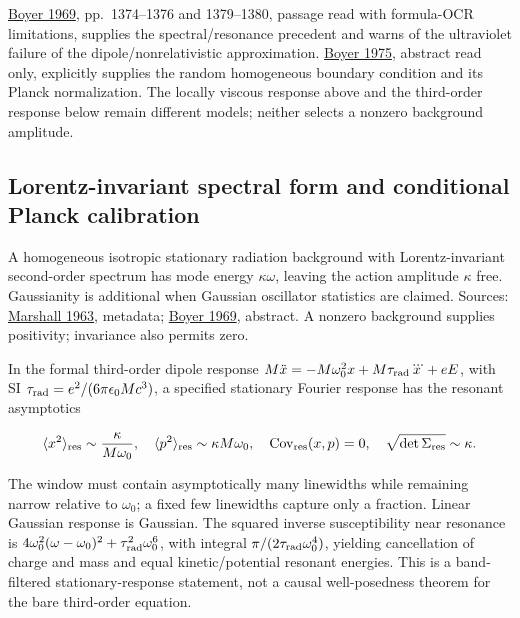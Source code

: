 \documentclass[11pt,a4paper]{article}
\begin{document}
\href{https://harvest.aps.org/v2/journals/articles/10.1103/PhysRev.182.1374/fulltext}{Boyer
1969}, pp.~1374--1376 and 1379--1380, passage read with formula-OCR
limitations, supplies the spectral/resonance precedent and warns of the
ultraviolet failure of the dipole/nonrelativistic approximation.
\href{https://journals.aps.org/prd/abstract/10.1103/PhysRevD.11.790}{Boyer
1975}, abstract read only, explicitly supplies the random homogeneous
boundary condition and its Planck normalization. The locally viscous
response above and the third-order response below remain different
models; neither selects a nonzero background amplitude.

\hypertarget{lorentz-invariant-spectral-form-and-conditional-planck-calibration}{%
\subsection{Lorentz-invariant spectral form and conditional Planck
calibration}\label{lorentz-invariant-spectral-form-and-conditional-planck-calibration}}

A homogeneous isotropic stationary radiation background with
Lorentz-invariant second-order spectrum has mode energy
\(\kappa\omega\), leaving the action amplitude \(\kappa\) free.
Gaussianity is additional when Gaussian oscillator statistics are
claimed. Sources: \href{https://doi.org/10.1098/rspa.1963.0220}{Marshall
1963}, metadata; \href{https://doi.org/10.1103/PhysRev.182.1374}{Boyer
1969}, abstract. A nonzero background supplies positivity; invariance
also permits zero.

In the formal third-order dipole response
\(M\ddot x=-M\omega_0^2x+M\tau_{\rm rad}\dddot x+eE\), with SI
\(\tau_{\rm rad}=e^2/(6\pi\epsilon_0Mc^3)\), a specified stationary
Fourier response has the resonant asymptotics

\[\langle x^2\rangle_{\rm res}\sim\frac\kappa{M\omega_0},\quad
\langle p^2\rangle_{\rm res}\sim\kappa M\omega_0,\quad
\operatorname{Cov}_{\rm res}(x,p)=0,\quad
\sqrt{\det\Sigma_{\rm res}}\sim\kappa.\]

The window must contain asymptotically many linewidths while remaining
narrow relative to \(\omega_0\); a fixed few linewidths capture only a
fraction. Linear Gaussian response is Gaussian. The squared inverse
susceptibility near resonance is
\(4\omega_0^2(\omega-\omega_0)^2+ \tau_{\rm rad}^2\omega_0^6\), with
integral \(\pi/(2\tau_{\rm rad}\omega_0^4)\), yielding cancellation of
charge and mass and equal kinetic/potential resonant energies. This is a
band-filtered stationary-response statement, not a causal well-posedness
theorem for the bare third-order equation.
\end{document}

